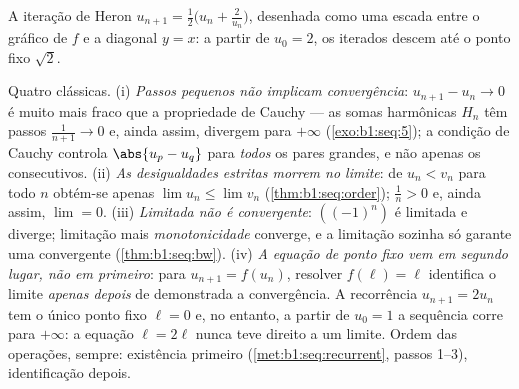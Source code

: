 \begin{omfigure}

{\small A iteração de Heron $u_{n+1} = \frac12\bigl(u_n +
\frac{2}{u_n}\bigr)$, desenhada como uma escada entre o gráfico de $f$
e a diagonal $y = x$: a partir de $u_0 = 2$, os iterados descem até
o ponto fixo $\sqrt 2$.}
\end{omfigure}

\begin{remark}
Quatro clássicas. (i) \emph{Passos pequenos não implicam convergência}:
$u_{n+1} - u_n \to 0$ é muito mais fraco que a propriedade de Cauchy ---
as somas harmônicas $H_n$ têm passos $\frac{1}{n+1} \to 0$ e, ainda assim,
divergem para $+\infty$ (\cref{exo:b1:seq:5}); a condição de Cauchy
controla $\abs{u_p - u_q}$ para \emph{todos} os pares grandes, e não
apenas os consecutivos. (ii) \emph{As desigualdades estritas morrem no
limite}: de $u_n < v_n$ para todo $n$ obtém-se apenas $\lim u_n
\leq \lim v_n$ (\cref{thm:b1:seq:order}); $\frac1n > 0$ e, ainda assim,
$\lim = 0$. (iii) \emph{Limitada não é convergente}: $((-1)^n)$
é limitada e diverge; limitação mais \emph{monotonicidade}
converge, e a limitação sozinha só garante uma 
convergente (\cref{thm:b1:seq:bw}). (iv) \emph{A equação de ponto fixo
vem em segundo lugar, não em primeiro}: para $u_{n+1} = f(u_n)$,
resolver $f(\ell) = \ell$ identifica o limite \emph{apenas depois}
de demonstrada a convergência. A recorrência $u_{n+1} = 2u_n$ tem o
único ponto fixo $\ell = 0$ e, no entanto, a partir de $u_0 = 1$ a
sequência corre para $+\infty$: a equação $\ell = 2\ell$ nunca teve
direito a um limite. Ordem das operações, sempre: existência
primeiro (\cref{met:b1:seq:recurrent}, passos 1--3), identificação
depois.
\end{remark}

